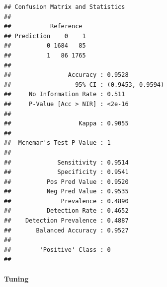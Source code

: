 \documentclass[
]{article}
\newenvironment{Shaded}{\begin{snugshade}}{\end{snugshade}}
\newcommand{\AttributeTok}[1]{\textcolor[rgb]{0.77,0.63,0.00}{#1}}
\newcommand{\DecValTok}[1]{\textcolor[rgb]{0.00,0.00,0.81}{#1}}
\newcommand{\FloatTok}[1]{\textcolor[rgb]{0.00,0.00,0.81}{#1}}
\newcommand{\FunctionTok}[1]{\textcolor[rgb]{0.00,0.00,0.00}{#1}}
\newcommand{\NormalTok}[1]{#1}
\newcommand{\OtherTok}[1]{\textcolor[rgb]{0.56,0.35,0.01}{#1}}
\newcommand{\SpecialCharTok}[1]{\textcolor[rgb]{0.00,0.00,0.00}{#1}}
\newcommand{\StringTok}[1]{\textcolor[rgb]{0.31,0.60,0.02}{#1}}
\begin{document}
\begin{verbatim}
## Confusion Matrix and Statistics
## 
##           Reference
## Prediction    0    1
##          0 1684   85
##          1   86 1765
##                                           
##                Accuracy : 0.9528          
##                  95% CI : (0.9453, 0.9594)
##     No Information Rate : 0.511           
##     P-Value [Acc > NIR] : <2e-16          
##                                           
##                   Kappa : 0.9055          
##                                           
##  Mcnemar's Test P-Value : 1               
##                                           
##             Sensitivity : 0.9514          
##             Specificity : 0.9541          
##          Pos Pred Value : 0.9520          
##          Neg Pred Value : 0.9535          
##              Prevalence : 0.4890          
##          Detection Rate : 0.4652          
##    Detection Prevalence : 0.4887          
##       Balanced Accuracy : 0.9527          
##                                           
##        'Positive' Class : 0               
## 
\end{verbatim}

\hypertarget{tuning}{%
\paragraph{Tuning}\label{tuning}}

\begin{Shaded}
\end{Shaded}
\end{document}

